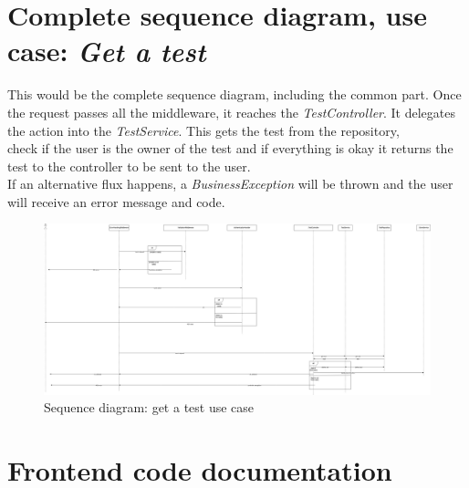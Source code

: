     \section{Complete sequence diagram, use case: \textit{Get a test}}
    This would be the complete sequence diagram, including the common part. Once the request passes all the middleware, it reaches the \textit{TestController}. It delegates the action into the \textit{TestService}. This gets the test from the repository, \\ 
    check if the user is the owner of the test and if everything is okay it returns the test to the controller to be sent to the user. \\
    If an alternative flux happens, a \textit{BusinessException} will be thrown and the user will receive an error message and code.
        \newpage
        \begin{figure}[H]
            \centering
                \includegraphics[angle=90, width=\textwidth, height=\textheight]{assets/diagrams/getatest.png}
            \caption{Sequence diagram: get a test use case}
            \label{fig:implementation_getatest}
        \end{figure}

\newpage
\section{Frontend code documentation}
